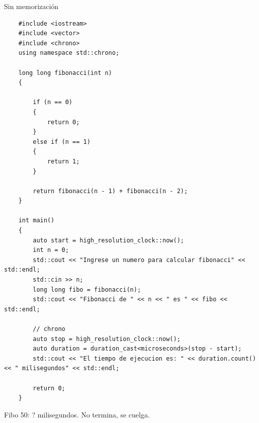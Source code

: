 \documentclass[10pt,a4paper]{article}
\begin{document}
Sin memorización
\begin{lstlisting}
    #include <iostream>
    #include <vector>
    #include <chrono>
    using namespace std::chrono;

    long long fibonacci(int n)
    {
        
        if (n == 0)
        {
            return 0;
        }
        else if (n == 1)
        {
            return 1;
        }
        
        return fibonacci(n - 1) + fibonacci(n - 2);
    }

    int main()
    {
        auto start = high_resolution_clock::now();
        int n = 0;
        std::cout << "Ingrese un numero para calcular fibonacci" << std::endl;
        std::cin >> n;
        long long fibo = fibonacci(n);
        std::cout << "Fibonacci de " << n << " es " << fibo << std::endl;

        // chrono
        auto stop = high_resolution_clock::now();
        auto duration = duration_cast<microseconds>(stop - start);
        std::cout << "El tiempo de ejecucion es: " << duration.count() << " milisegundos" << std::endl;

        return 0;
    }
\end{lstlisting}
Fibo 50: ? milisegundos. No termina, se cuelga.
\end{document}
